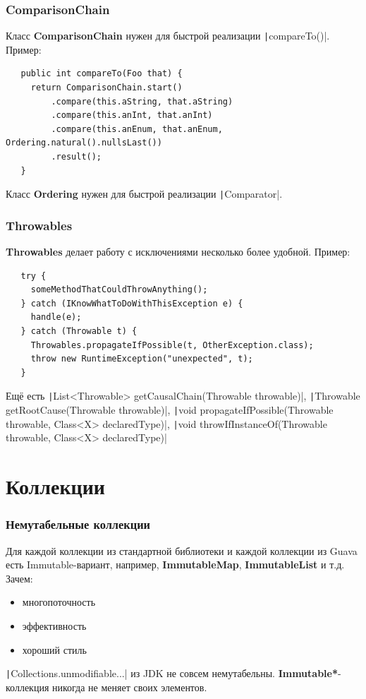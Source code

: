 \documentclass[xetex,mathserif,serif]{beamer}
\begin{document}
	\begin{frame}[fragile]
		\frametitle{ComparisonChain}
		Класс \textbf{ComparisonChain} нужен для быстрой реализации \texttt|compareTo()|. Пример:
		
		\begin{verbatim}
   public int compareTo(Foo that) {
     return ComparisonChain.start()
         .compare(this.aString, that.aString)
         .compare(this.anInt, that.anInt)
         .compare(this.anEnum, that.anEnum, Ordering.natural().nullsLast())
         .result();
   }
		\end{verbatim}

		Класс \textbf{Ordering} нужен для быстрой реализации \texttt|Comparator|.
\end{frame}

	\begin{frame}[fragile]
		\frametitle{Throwables}
		\textbf{Throwables} делает работу с исключениями несколько более удобной. Пример:

		\begin{verbatim}
   try {
     someMethodThatCouldThrowAnything();
   } catch (IKnowWhatToDoWithThisException e) {
     handle(e);
   } catch (Throwable t) {
     Throwables.propagateIfPossible(t, OtherException.class);
     throw new RuntimeException("unexpected", t);
   }
		\end{verbatim}

		\begin{scriptsize}
			Ещё есть \texttt|List<Throwable> getCausalChain(Throwable throwable)|, \texttt|Throwable getRootCause(Throwable throwable)|, \texttt|void propagateIfPossible(Throwable throwable, Class<X> declaredType)|, \texttt|void throwIfInstanceOf(Throwable throwable, Class<X> declaredType)|
		\end{scriptsize}
\end{frame}

 	\section{Коллекции}

	\begin{frame}
		\frametitle{Немутабельные коллекции}
		Для каждой коллекции из стандартной библиотеки и каждой коллекции из Guava есть Immutable-вариант, например, \textbf{ImmutableMap}, \textbf{ImmutableList} и т.д. Зачем:
		\begin{itemize}
			\item многопоточность
			\item эффективность
			\item хороший стиль
		\end{itemize}
		\texttt|Collections.unmodifiable...| из JDK не совсем немутабельны. \textbf{Immutable*}-коллекция никогда не меняет своих элементов.
	\end{frame}
\end{document}
